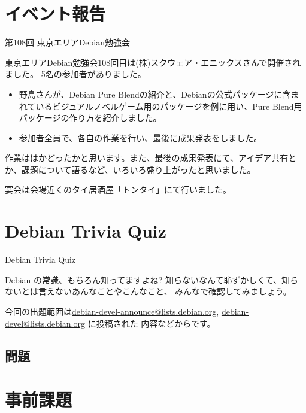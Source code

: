 \section{イベント報告}

\begin{frame}{第108回 東京エリアDebian勉強会}

 東京エリアDebian勉強会108回目は(株)スクウェア・エニックスさんで開催されました。
5名の参加者がありました。

\begin{itemize}
\item 野島さんが、Debian Pure Blendの紹介と、Debianの公式パッケージに含まれているビジュアルノベルゲーム用のパッケージを例に用い、Pure Blend用パッケージの作り方を紹介しました。
\item 参加者全員で、各自の作業を行い、最後に成果発表をしました。
\end{itemize}

 作業ははかどったかと思います。また、最後の成果発表にて、アイデア共有とか、課題について語るなど、いろいろ盛り上がったと思いました。

 宴会は会場近くのタイ居酒屋「トンタイ」にて行いました。

\end{frame}

\section{Debian Trivia Quiz}
\begin{frame}{Debian Trivia Quiz}

  Debian の常識、もちろん知ってますよね?
知らないなんて恥ずかしくて、知らないとは言えないあんなことやこんなこと、
みんなで確認してみましょう。

今回の出題範囲は\url{debian-devel-announce@lists.debian.org},
\url{debian-devel@lists.debian.org} に投稿された
内容などからです。

\end{frame}

\subsection{問題}


\section{事前課題}
{\footnotesize

}

